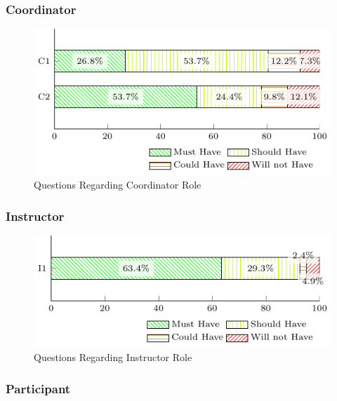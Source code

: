 \subsubsection{Coordinator}\label{sec:survey-quant-coordinator}

\begin{figure}[!htb]
  \caption{Questions Regarding Coordinator Role}\label{fig:coordinator-questions}
  \begin{center}
    \includegraphics[width=13cm]{img/5-questions-coordinator.pdf}
  \end{center}
\end{figure}

\subsubsection{Instructor}\label{sec:survey-quant-instructor}

\begin{figure}[!htb]
  \caption{Questions Regarding Instructor Role}\label{fig:instructor-questions}
  \begin{center}
    \includegraphics[width=13cm]{img/5-questions-instructor.pdf}
  \end{center}
\end{figure}

\subsubsection{Participant}\label{sec:survey-quant-participant}

